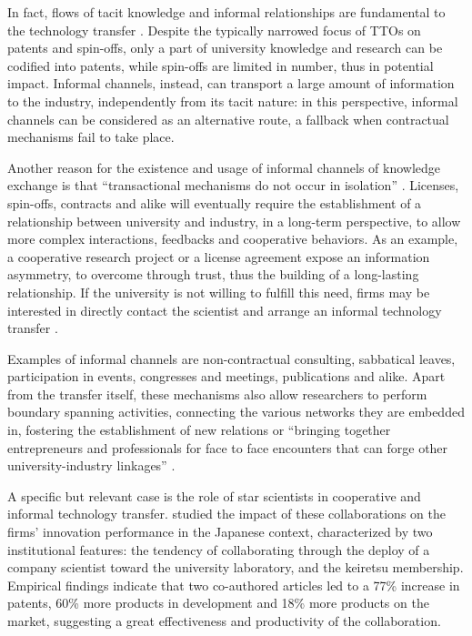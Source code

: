 In fact, flows of tacit knowledge and informal relationships are fundamental to the technology transfer \citep{Geuna2009}. Despite the typically narrowed focus of TTOs on patents and spin-offs, only a part of university knowledge and research can be codified into patents, while spin-offs are limited in number, thus in potential impact. Informal channels, instead, can transport a large amount of information to the industry, independently from its tacit nature: in this perspective, informal channels can be considered as an alternative route, a fallback when contractual mechanisms fail to take place.

Another reason for the existence and usage of informal channels of knowledge exchange is that \enquote{transactional mechanisms do not occur in isolation} \citep{Bercovitz2006}. Licenses, spin-offs, contracts and alike will eventually require the establishment of a relationship between university and industry, in a long-term perspective, to allow more complex interactions, feedbacks and cooperative behaviors. As an example, a cooperative research project or a license agreement expose an information asymmetry, to overcome through trust, thus the building of a long-lasting relationship. If the university is not willing to fulfill this need, firms may be interested in directly contact the scientist and arrange an informal technology transfer \citep{Siegel2003a, Link2007}. 

Examples of informal channels are non-contractual consulting, sabbatical leaves, participation in events, congresses and meetings, publications and alike. Apart from the transfer itself, these mechanisms also allow researchers to perform boundary spanning activities, connecting the various networks they are embedded in, fostering the establishment of new relations or \enquote{bringing together entrepreneurs and professionals for face to face encounters that can forge other university-industry linkages} \citep{Yusuf2008}.

A specific but relevant case is the role of star scientists in cooperative and informal technology transfer. \citet{Zucker2001} studied the impact of these collaborations on the firms' innovation performance in the Japanese context, characterized by two institutional features: the tendency of collaborating through the deploy of a company scientist toward the university laboratory, and the keiretsu membership. Empirical findings indicate that two co-authored articles led to a 77\% increase in patents, 60\% more products in development and 18\% more products on the market, suggesting a great effectiveness and productivity of the collaboration.

